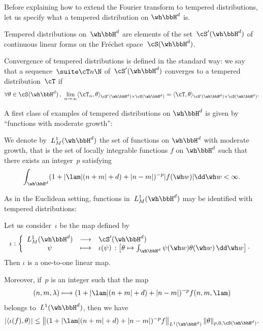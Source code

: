 Before explaining how to extend the Fourier transform to tempered distributions, let us specify what a tempered distribution on $\wh\bbH^d$ is.

\begin{defi}\label{definSprimewhH}
Tempered distributions on~$\wh\bbH^d$ are elements of the set~$\cS'(\wh \bbH^d)$ of continuous linear forms on the Fr\'echet space~$\cS(\wh \bbH^d)$.
\end{defi}

Convergence of tempered distributions is defined in the standard way: we say that a sequence~$\suite \cT n \N$ of~$\cS'(\wh \bbH^d)$ converges to a tempered distribution~$\cT$ if
\[
\forall \theta \in \cS(\wh \bbH^d)\,, \ \lim_{n\rightarrow \infty} \langle \cT_n,\theta\rangle _{\cS'(\wh\bbH^d)\times \cS(\wh \bbH^d)} = \langle \cT,\theta\rangle _{\cS'(\wh\bbH^d)\times \cS(\wh \bbH^d)}.
\]

A first class of examples of tempered distributions on $\wh\bbH^d$ is given by ``functions with moderate growth'':

\begin{defi}\label{definL1Moderated}
We denote by~$ L^1_M(\wh\bbH^d) $ the set of functions on $\wh\bbH^d$ with moderate growth, that is the set of locally integrable functions $f$ on $\wh\bbH^d$ such that there exists an integer~$p$ satisfying
\[
\int_{\wh \bbH^d} (1+|\lam|(n+m|+d)+|n-m|)^{-p}|f(\wh w) |\dd\wh w<\infty.
\]
\end{defi}

As in the Euclidean setting, functions in~$L^1_M(\wh \bbH^d)$ may be identified with tempered distributions:

\begin{theo}\label{indentifonctdistritemp}
Let us consider~$\iota$ be the map defined by
\[
\iota :\left\{
\begin{array}{ccl}
L^1_M(\wh\bbH^d) & \longrightarrow & \cS'(\wh\bbH^d) \\
\psi & \longmapsto & \iota(\psi)\,: \left[\theta \mapsto \int_{\wh \bbH^d} \psi(\wh w)\theta(\wh w)\, \dd\wh w\right]\cdotp
\end{array}
\right.
\]
Then $\iota$ is a one-to-one linear map.

Moreover, if~$p$ is an integer such that the map
\[
(n,m,\lambda)\longmapsto(1+|\lam|(n+m|+d)+|n-m|)^{-p}f(n,m,\lam)
\]
belongs to~$L^1(\wh \bbH^d)$, then we have
\begin{equation}\label{eq:boundf}
|\langle \iota(f),\theta\rangle | \leq \left\|(1+|\lam|(n+m|+d)+|n-m|)^{-p}f\right\|_{L^1(\wh \bbH^d)}
\|\theta\|_{p,0,\cS(\wh\bbH^d)}.
\end{equation}
\end{theo}

